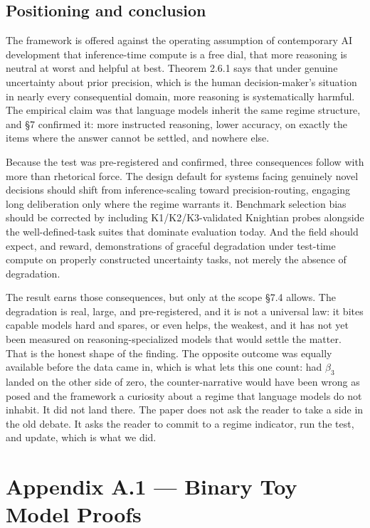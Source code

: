 \documentclass{article}
\begin{document}
\subsection{Positioning and
conclusion}\label{positioning-and-conclusion}

The framework is offered against the operating assumption of
contemporary AI development that inference-time compute is a free dial,
that more reasoning is neutral at worst and helpful at best. Theorem
2.6.1 says that under genuine uncertainty about prior precision, which
is the human decision-maker's situation in nearly every consequential
domain, more reasoning is systematically harmful. The empirical claim
was that language models inherit the same regime structure, and \S{}7
confirmed it: more instructed reasoning, lower accuracy, on exactly the
items where the answer cannot be settled, and nowhere else.

Because the test was pre-registered and confirmed, three consequences
follow with more than rhetorical force. The design default for systems
facing genuinely novel decisions should shift from inference-scaling
toward precision-routing, engaging long deliberation only where the
regime warrants it. Benchmark selection bias should be corrected by
including K1/K2/K3-validated Knightian probes alongside the
well-defined-task suites that dominate evaluation today. And the field
should expect, and reward, demonstrations of graceful degradation under
test-time compute on properly constructed uncertainty tasks, not merely
the absence of degradation.

The result earns those consequences, but only at the scope \S{}7.4 allows.
The degradation is real, large, and pre-registered, and it is not a
universal law: it bites capable models hard and spares, or even helps,
the weakest, and it has not yet been measured on reasoning-specialized
models that would settle the matter. That is the honest shape of the
finding. The opposite outcome was equally available before the data came
in, which is what lets this one count: had \(\beta_{3}\) landed on the
other side of zero, the counter-narrative would have been wrong as posed
and the framework a curiosity about a regime that language models do not
inhabit. It did not land there. The paper does not ask the reader to
take a side in the old debate. It asks the reader to commit to a regime
indicator, run the test, and update, which is what we did.

\setcounter{secnumdepth}{-1}

\section{Appendix A.1 --- Binary Toy Model
Proofs}\label{appendix-a.1-binary-toy-model-proofs}
\end{document}
